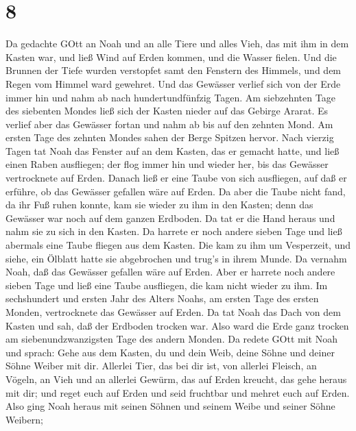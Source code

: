 \hypertarget{section-7}{%
\section{8}\label{section-7}}

 Da gedachte GOtt an Noah und an alle Tiere und alles Vieh,
das mit ihm in dem Kasten war, und ließ Wind auf Erden kommen, und die
Wasser fielen.  Und die Brunnen der Tiefe wurden verstopfet
samt den Fenstern des Himmels, und dem Regen vom Himmel ward gewehret.
 Und das Gewässer verlief sich von der Erde immer hin und
nahm ab nach hundertundfünfzig Tagen.  Am siebzehnten Tage
des siebenten Mondes ließ sich der Kasten nieder auf das Gebirge Ararat.
 Es verlief aber das Gewässer fortan und nahm ab bis auf den
zehnten Mond. Am ersten Tage des zehnten Mondes sahen der Berge Spitzen
hervor.  Nach vierzig Tagen tat Noah das Fenster auf an dem
Kasten, das er gemacht hatte,  und ließ einen Raben
ausfliegen; der flog immer hin und wieder her, bis das Gewässer
vertrocknete auf Erden.  Danach ließ er eine Taube von sich
ausfliegen, auf daß er erführe, ob das Gewässer gefallen wäre auf Erden.
 Da aber die Taube nicht fand, da ihr Fuß ruhen konnte, kam
sie wieder zu ihm in den Kasten; denn das Gewässer war noch auf dem
ganzen Erdboden. Da tat er die Hand heraus und nahm sie zu sich in den
Kasten.  Da harrete er noch andere sieben Tage und ließ
abermals eine Taube fliegen aus dem Kasten.  Die kam zu ihm
um Vesperzeit, und siehe, ein Ölblatt hatte sie abgebrochen und trug's
in ihrem Munde. Da vernahm Noah, daß das Gewässer gefallen wäre auf
Erden.  Aber er harrete noch andere sieben Tage und ließ
eine Taube ausfliegen, die kam nicht wieder zu ihm.  Im
sechshundert und ersten Jahr des Alters Noahs, am ersten Tage des ersten
Monden, vertrocknete das Gewässer auf Erden. Da tat Noah das Dach von
dem Kasten und sah, daß der Erdboden trocken war.  Also
ward die Erde ganz trocken am siebenundzwanzigsten Tage des andern
Monden.  Da redete GOtt mit Noah und sprach: 
Gehe aus dem Kasten, du und dein Weib, deine Söhne und deiner Söhne
Weiber mit dir.  Allerlei Tier, das bei dir ist, von
allerlei Fleisch, an Vögeln, an Vieh und an allerlei Gewürm, das auf
Erden kreucht, das gehe heraus mit dir; und reget euch auf Erden und
seid fruchtbar und mehret euch auf Erden.  Also ging Noah
heraus mit seinen Söhnen und seinem Weibe und seiner Söhne Weibern;
